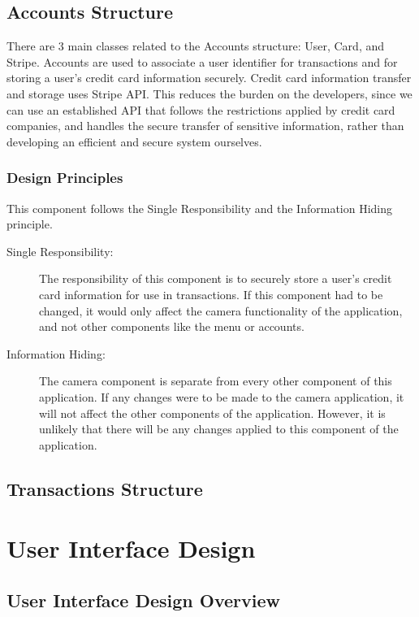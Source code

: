 \documentclass[12pt, titlepage]{article}
\begin{document}
\subsection{Accounts Structure}
There are 3 main classes related to the Accounts structure: User, Card, and Stripe. Accounts are used to associate a user identifier for transactions and for storing a user's credit card information securely. Credit card information transfer and storage uses Stripe API. This reduces the burden on the developers, since we can use an established API that follows the restrictions applied by credit card companies, and handles the secure transfer of sensitive information, rather than developing an efficient and secure system ourselves.

\subsubsection{Design Principles}
This component follows the Single Responsibility and the Information Hiding principle.  

\begin{description}
	\item[Single Responsibility:] The responsibility of this component is to securely store a user's credit card information for use in transactions. If this component had to be changed, it would only affect the camera functionality of the application, and not other components like the menu or accounts.
	\item[Information Hiding:] The camera component is separate from every other component of this application. If any changes were to be made to the camera application, it will not affect the other components of the application. However, it is unlikely that there will be any changes applied to this component of the application.
\end{description}
 
\subsection{Transactions Structure}

\section{User Interface Design}

\subsection{User Interface Design Overview}
\end{document}
